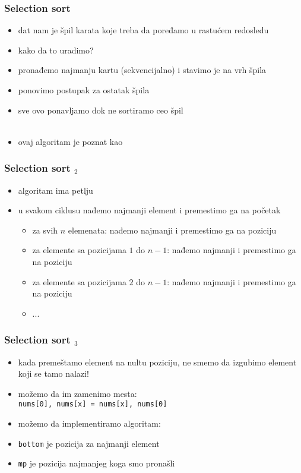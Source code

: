 \documentclass[utf8,compress,aspectratio=169]{beamer}
\begin{document}
\begin{frame}[fragile]
  \frametitle{Selection sort}
  \begin{itemize}
    \item dat nam je špil karata koje treba da poređamo u rastućem redosledu
    \item kako da to uradimo?
    \item pronađemo najmanju kartu (sekvencijalno) i stavimo je na vrh špila
    \item ponovimo postupak za ostatak špila
    \item sve ovo ponavljamo dok ne sortiramo ceo špil \\ \ \\
    \item ovaj algoritam je poznat kao 
  \end{itemize}
\end{frame}

\begin{frame}[fragile]
  \frametitle{Selection sort $_2$}
  \begin{itemize}
    \item algoritam ima petlju
    \item u svakom ciklusu nađemo najmanji element i premestimo ga na početak
  \begin{itemize}
    \item za svih $n$ elemenata: nađemo najmanji i premestimo ga na  poziciju
    \item za elemente sa pozicijama $1$ do $n-1$: nađemo najmanji i premestimo ga na  poziciju
    \item za elemente sa pozicijama $2$ do $n-1$: nađemo najmanji i premestimo ga na  poziciju
    \item ...
  \end{itemize}
  \end{itemize}
\end{frame}

\begin{frame}[fragile]
  \frametitle{Selection sort $_3$}
  \begin{itemize}
    \item kada premeštamo element na nultu poziciju, ne smemo da izgubimo element koji se tamo nalazi!
    \item možemo da im zamenimo mesta: \\
      \texttt{nums[0], nums[x] = nums[x], nums[0]}
    \item možemo da implementiramo algoritam:
    \item \texttt{bottom} je pozicija za najmanji element
    \item \texttt{mp} je pozicija najmanjeg koga smo pronašli
  \end{itemize}
\end{frame}
\end{document}
